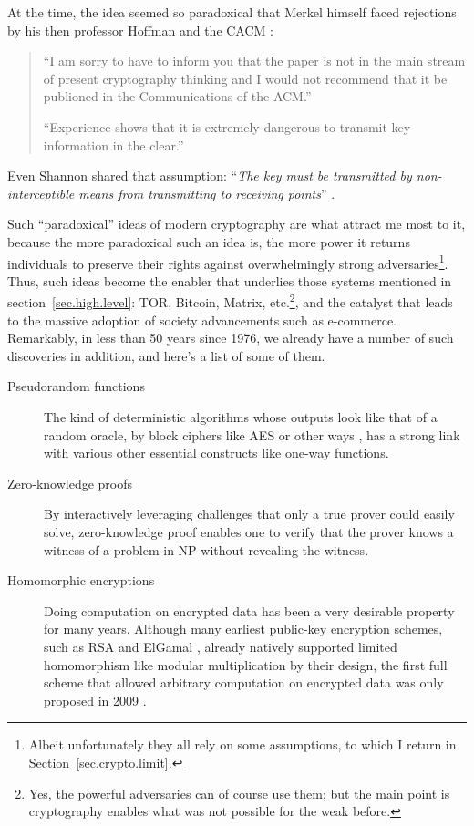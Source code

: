 \documentclass[10pt]{article}
\begin{document}
At the time, the idea seemed so paradoxical that Merkel himself faced 
rejections by his then professor Hoffman and the
CACM \cite{merkle.rejection}:
\begin{quotation}
	``I am sorry to have to inform you that the paper is not in the main stream
	of present cryptography thinking and I would not recommend that it be
	publioned in the Communications of the ACM.''

	``Experience shows that it is extremely dangerous to transmit key
	information in the clear.''\cite{merkle.rejection}
\end{quotation}
Even Shannon shared that assumption: ``\emph{The key must be transmitted by
non-interceptible means from transmitting to receiving points}''
\cite[p.~670]{shannon.theory.secrecy}.

Such ``paradoxical'' ideas of modern cryptography are what attract me most to
it, because the more paradoxical such an idea is, the more power it returns
individuals to preserve their rights against overwhelmingly strong
adversaries\footnote{Albeit unfortunately they all rely on some assumptions, to
which I return in Section~\ref{sec.crypto.limit}.}.  Thus, such ideas become
the enabler that underlies those systems mentioned in
section~\ref{sec.high.level}: TOR, Bitcoin, Matrix, etc.\footnote{Yes, the
powerful adversaries can of course use them; but the main point is cryptography
enables what was not possible for the weak before.}, and the catalyst that
leads to the massive adoption of society advancements such as e-commerce.
Remarkably, in less than 50 years since 1976, we already have a number of such
discoveries in addition, and here's a list of some of them.
\begin{description}
\item[Pseudorandom functions] The kind of deterministic algorithms
	whose outputs look like that of a random oracle, by block ciphers like
	AES\cite{aes} or other ways \cite{pseudo.rand.cons.2}, has a strong link
	with various other essential constructs like one-way functions.

\item[Zero-knowledge proofs] By interactively leveraging challenges that only a
	true prover could easily solve, zero-knowledge proof \cite{zero.knowledge}
	enables one to verify that the prover knows a witness of a problem in NP
	\cite{zero.knowledge.np} without revealing the witness.

\item[Homomorphic encryptions] Doing computation on encrypted data has been a
	very desirable property for many years. Although many earliest public-key
	encryption schemes, such as RSA \cite{rsa} and ElGamal \cite{elgamal},
	already natively supported limited homomorphism like modular
	multiplication by their design, the first full scheme that allowed
	arbitrary computation on encrypted data was only proposed in 2009
	\cite{first.full.homo}.
\end{description}
\end{document}

